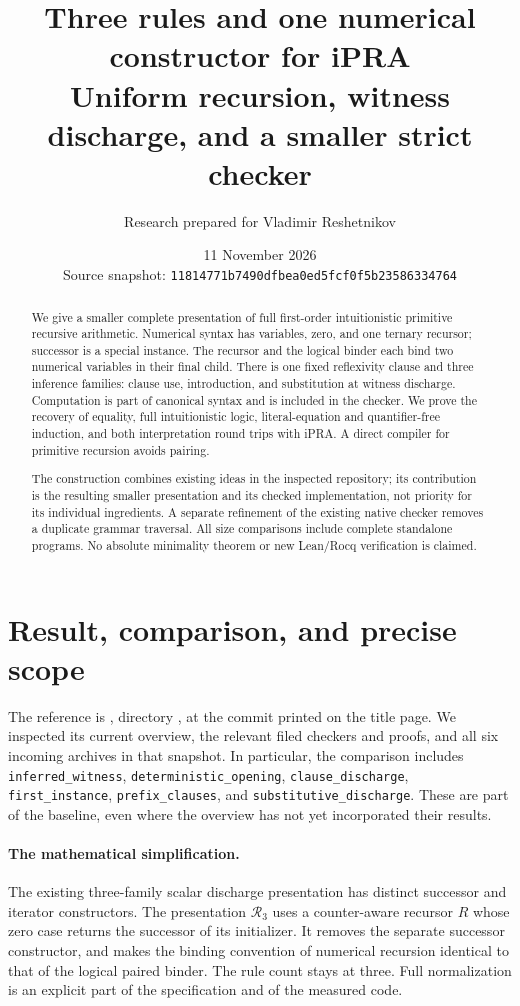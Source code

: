 \documentclass[11pt,letterpaper]{article}
\title{\color{ink}Three rules and one numerical constructor for iPRA\\[5pt]
 \large Uniform recursion, witness discharge, and a smaller strict checker}
\author{Research prepared for Vladimir Reshetnikov}
\date{11 November 2026\\\small Source snapshot: \texttt{11814771b7490dfbea0ed5fcf0f5b23586334764}}
\theoremstyle{definition}\newtheorem{definition}[theorem]{Definition}
\theoremstyle{remark}\newtheorem{remark}[theorem]{Remark}
\newcommand{\RN}{\mathcal R_3}
\begin{document}
\maketitle
\begin{abstract}
We give a smaller complete presentation of full first-order intuitionistic
primitive recursive arithmetic. Numerical syntax has variables, zero, and
one ternary recursor; successor is a special instance. The recursor and the
logical binder each bind two numerical variables in their final child.
There is one fixed reflexivity clause and three inference families:
clause use, introduction, and substitution at witness discharge.
Computation is part of canonical syntax and is included in the checker.
We prove the recovery of equality, full intuitionistic logic, literal-equation
and quantifier-free induction, and both interpretation round trips with iPRA.
A direct compiler for primitive recursion avoids pairing.

The construction combines existing ideas in the inspected repository;
its contribution is the resulting smaller presentation and its checked
implementation, not priority for its individual ingredients. A separate
refinement of the existing native checker removes a duplicate grammar
traversal. All size comparisons include complete standalone programs.
No absolute minimality theorem or new Lean/Rocq verification is claimed.
\end{abstract}
\setcounter{tocdepth}{1}
\tableofcontents
\newpage

\section{Result, comparison, and precise scope}\label{sec:result}

The reference is , directory
, at the commit
printed on the title page. We inspected its current overview, the relevant
filed checkers and proofs, and all six incoming archives in that snapshot.
In particular, the comparison includes \texttt{inferred\_witness},
\texttt{deterministic\_opening}, \texttt{clause\_discharge},
\texttt{first\_instance}, \texttt{prefix\_clauses}, and
\texttt{substitutive\_discharge}. These are part of the baseline, even
where the overview has not yet incorporated their results.

\paragraph{The mathematical simplification.}
The existing three-family scalar discharge presentation has distinct
successor and iterator constructors. The presentation $\RN$ uses a
counter-aware recursor $R$ whose zero case returns the successor of its
initializer. It removes the separate successor constructor, and makes
the binding convention of numerical recursion identical to that of the
logical paired binder. The rule count stays at three. Full normalization
is an explicit part of the specification and of the measured code.
\end{document}
